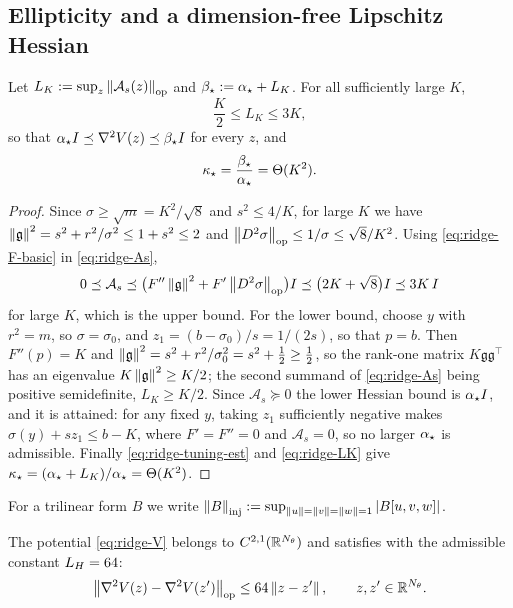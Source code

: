 \subsection{Ellipticity and a dimension-free Lipschitz Hessian}

\begin{lemma}
\label{lem:ridge-ellipticity}
Let $L_K:=\sup_{z}\left\lVert \mathcal A_s(z)\right\rVert_{\mathrm{op}}$ and $\beta_\star:=\alpha_\star+L_K$. For all
sufficiently large $K$,
\begin{equation}
\label{eq:ridge-LK}
    \frac K2\leq L_K\leq3K,
\end{equation}
so that $\alpha_\star I\preceq\nabla^2V(z)\preceq\beta_\star I$ for every $z$, and
\begin{equation}
\label{eq:ridge-kappa}
    \kappa_\star=\frac{\beta_\star}{\alpha_\star}=\Theta(K^2).
\end{equation}
\end{lemma}

\begin{proof}
Since $\sigma\geq\sqrt m=K^2/\sqrt8$ and $s^2\leq4/K$, for large $K$ we have
$\left\lVert \mathfrak g\right\rVert^2=s^2+r^2/\sigma^2\leq1+s^2\leq2$ and
$\left\lVert D^2\sigma\right\rVert_{\mathrm{op}}\leq1/\sigma\leq\sqrt8/K^2$. Using \eqref{eq:ridge-F-basic} in
\eqref{eq:ridge-As},
\[
    0\preceq\mathcal A_s
    \preceq\bigl(F''\left\lVert \mathfrak g\right\rVert^2+F'\left\lVert D^2\sigma\right\rVert_{\mathrm{op}}\bigr)I
    \preceq\bigl(2K+\sqrt8\bigr)I\preceq3K\,I
\]
for large $K$, which is the upper bound. For the lower bound, choose $y$ with $r^2=m$, so
$\sigma=\sigma_0$, and $z_1=(b-\sigma_0)/s=1/(2s)$, so that $p=b$. Then $F''(p)=K$ and
$\left\lVert \mathfrak g\right\rVert^2=s^2+r^2/\sigma_0^2=s^2+\tfrac12\geq\tfrac12$, so the rank-one matrix
$K\mathfrak g\mathfrak g^\top$ has an eigenvalue $K\left\lVert \mathfrak g\right\rVert^2\geq K/2$; the second
summand of \eqref{eq:ridge-As} being positive semidefinite, $L_K\geq K/2$. Since
$\mathcal A_s\succeq0$ the lower Hessian bound is $\alpha_\star I$, and it is attained: for any
fixed $y$, taking $z_1$ sufficiently negative makes $\sigma(y)+sz_1\leq b-K$, where
$F'=F''=0$ and $\mathcal A_s=0$, so no larger $\alpha_\star$ is admissible. Finally
\eqref{eq:ridge-tuning-est} and \eqref{eq:ridge-LK} give
$\kappa_\star=(\alpha_\star+L_K)/\alpha_\star=\Theta(K^2)$.
\end{proof}

For a trilinear form $B$ we write
$\left\lVert B\right\rVert_{\mathrm{inj}}:=\sup_{\left\lVert u\right\rVert=\left\lVert v\right\rVert=\left\lVert w\right\rVert=1}\left\lvert B[u,v,w]\right\rvert$.

\begin{lemma}
\label{lem:ridge-hesslip}
The potential \eqref{eq:ridge-V} belongs to $C^{2,1}(\mathbb{R}^{N_\theta})$ and satisfies
 with the admissible constant $L_H=64$:
\begin{equation}
\label{eq:ridge-64}
    \left\lVert \nabla^2V(z)-\nabla^2V(z')\right\rVert_{\mathrm{op}}\leq64\left\lVert z-z'\right\rVert,
    \qquad z,z'\in\mathbb{R}^{N_\theta}.
\end{equation}
\end{lemma}

